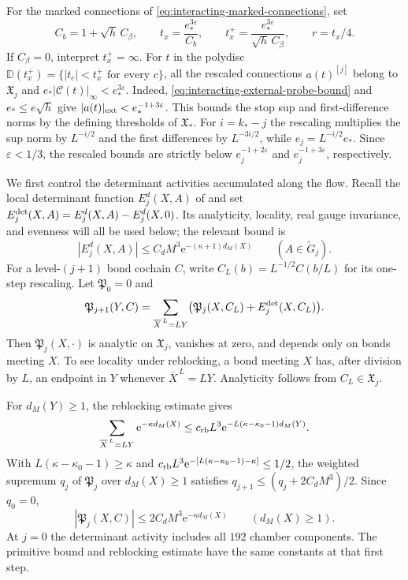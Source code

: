 For the marked connections of
\eqref{eq:interacting-marked-connections}, set
\begin{equation}\label{eq:interacting-mark-radii}
 C_b=1+\sqrt h\,C_\beta,\qquad
 t_x=\frac{e_*^{3\varepsilon}}{C_b},\qquad
 t_x^+=\frac{e_*^{3\varepsilon}}{\sqrt h\,C_\beta},
 \qquad r=t_x/4.
\end{equation}
If $C_\beta=0$, interpret $t_x^+=\infty$.
For $t$ in the polydisc
$\mathbb D(t_x^+)=\{|t_c|<t_x^+\text{ for every }c\}$,
all the rescaled connections $a(t)^{[j]}$
belong to $\mathfrak X_j$ and
$e_*|\mathscr C(t)|_\infty<e_*^{3\varepsilon}$.
Indeed, \eqref{eq:interacting-external-probe-bound}
and $e_*\le e\sqrt h$ give
$|a(t)|_{\rm ext}<e_*^{-1+3\varepsilon}$.
This bounds the stop sup and first-difference
norms by the defining thresholds of $\mathfrak X_*$.
For $i=k_*-j$ the rescaling multiplies
the sup norm by $L^{-i/2}$ and the first
differences by $L^{-3i/2}$, while
$e_j=L^{-i/2}e_*$. Since
$\varepsilon<1/3$, the rescaled bounds are
strictly below $e_j^{-1+2\varepsilon}$ and
$e_j^{-1+3\varepsilon}$, respectively.

We first control the determinant activities accumulated
along the flow. Recall the local determinant
function $E_j^d(X,A)$ of
\cite[Proposition~6.1]{FermionBlock} and set
$E_j^{\rm det}(X,A)=E_j^d(X,A)-E_j^d(X,0)$.
Its analyticity, locality, real gauge invariance,
and evenness will all be used below; the relevant
bound is
\begin{equation}\label{eq:interacting-determinant-input}
 |E_j^d(X,A)|\le C_dM^3\mathrm e^{-(\kappa+1)d_M(X)}
                       \qquad(A\in\widetilde G_j).
\end{equation}
For a level-$(j+1)$ bond cochain $C$, write
$C_L(b)=L^{-1/2}C(b/L)$ for its one-step rescaling.
Let $\mathfrak P_0=0$ and
\begin{equation}\label{eq:interacting-P-recursion}
 \mathfrak P_{j+1}(Y,C)=
 \sum_{\overline X^{\,L}=LY}
       \bigl(\mathfrak P_j(X,C_L)+E_j^{\rm det}(X,C_L)\bigr).
\end{equation}
Then $\mathfrak P_j(X,\cdot)$ is analytic on
$\mathfrak X_j$, vanishes at zero, and depends only
on bonds meeting $X$. To see locality under
reblocking, a bond meeting $X$ has, after division
by $L$, an endpoint in $Y$ whenever
$\overline X^{\,L}=LY$. Analyticity follows from
$C_L\in\mathfrak X_j$.

For $d_M(Y)\ge1$, the reblocking estimate gives
\[
 \sum_{\overline X^{\,L}=LY}\mathrm e^{-\kappa d_M(X)}
 \le c_{\rm rb}L^3\mathrm e^{-L(\kappa-\kappa_0-1)d_M(Y)}.
\]
With
$L(\kappa-\kappa_0-1)\ge\kappa$ and
$c_{\rm rb}L^3\mathrm e^{-[L(\kappa-\kappa_0-1)-\kappa]}\le1/2$,
the weighted supremum $q_j$ of $\mathfrak P_j$
over $d_M(X)\ge1$ satisfies
$q_{j+1}\le(q_j+2C_dM^3)/2$. Since $q_0=0$,
\begin{equation}\label{eq:interacting-P-bound}
 |\mathfrak P_j(X,C)|\le2C_dM^3\mathrm e^{-\kappa d_M(X)}
                           \qquad(d_M(X)\ge1).
\end{equation}
At $j=0$ the determinant activity includes all
$192$ chamber components. The primitive bound and
reblocking estimate have the same constants at
that first step.

